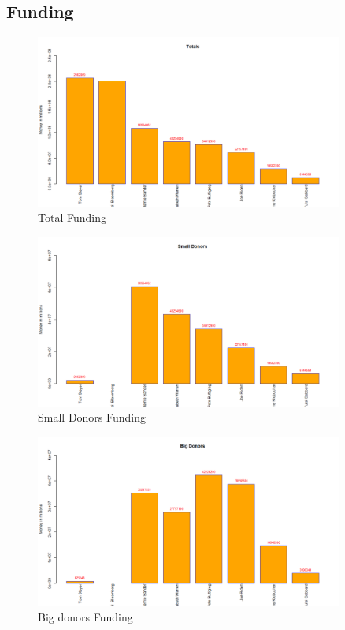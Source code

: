 \subsection{Funding}

\begin{figure}[H]
    \centering
    \includegraphics[width=0.9\textwidth]{figures/Total.png}
    \caption{Total Funding}
    \label{Total}
\end{figure}

\begin{figure}[H]
    \centering
    \includegraphics[width=0.9\textwidth]{figures/Small Donors.png}
    \caption{Small Donors Funding}
    \label{Small Donors}
\end{figure}

\begin{figure}[H]
    \centering
    \includegraphics[width=0.9\textwidth]{figures/Bigdonor.png}
    \caption{Big donors Funding}
    \label{Bigdonor}
\end{figure}

